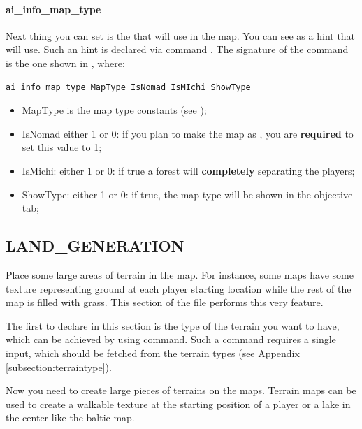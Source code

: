 \begin{appendices}
    \paragraph{ai\_info\_map\_type}

    Next thing you can set is the  that \aoe{} will use in the map. You can see as a hint that \aoe{} will use. Such an hint is declared via command . The signature of the command is the one shown in , where:

    \begin{lstlisting}[language=rms,label=rms:setai]
        ai_info_map_type MapType IsNomad IsMIchi ShowType
    \end{lstlisting}

    \begin{itemize}
        \item MapType is the map type constants (see );
        \item IsNomad either 1 or 0: if you plan to make the map as , you are \textbf{required} to set this value to 1;
        \item IsMichi: either 1 or 0: if true a forest will \textbf{completely} separating the players;
        \item ShowType: either 1 or 0: if true, the map type will be shown in the objective tab;
    \end{itemize}

    \subsection{LAND\_GENERATION}

    Place some large areas of terrain in the map. For instance, some maps have some texture representing ground at each player starting location while the rest of the map is filled with grass. This section of the file performs this very feature.

    The first to declare in this section is the type of the terrain you want to have, which can be achieved by using  command. Such a command requires a single input, which should be fetched from the terrain types (see Appendix \ref{subsection:terraintype}).

    Now you need to create large pieces of terrains on the maps. Terrain maps can be used to create a walkable texture at the starting position of a player or a lake in the center like the baltic map\cite{zetnus:2015}.


\end{appendices}
